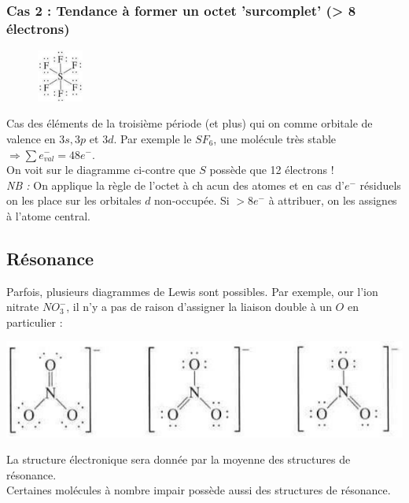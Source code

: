 \documentclass[12pt, a4paper]{article}
\begin{document}
\subsubsection{Cas 2 :  Tendance à former un octet 'surcomplet' (> 8 électrons)}
\begin{figure}
\includegraphics[width=1.5cm]{image9.png}
\end{figure}
Cas des éléments de la troisième période (et plus) qui on comme orbitale de valence en $3s, 3p$ et $3d$. Par exemple le $SF_6$, une molécule très stable\\
$\Rightarrow \sum e^-_{val} = 48 e^-$.\\
On voit sur le diagramme ci-contre que $S$ possède que 12 électrons !\\

\textit{NB :} On applique la règle de l'octet à ch acun des atomes et en cas d'$e^-$ résiduels on les place sur les orbitales $d$ non-occupée. Si $> 8 e^-$ à attribuer, on les assignes à l'atome central.
\newpage
\subsection{Résonance}
Parfois, plusieurs diagrammes de Lewis sont possibles. Par exemple, our l'ion nitrate $NO_3^-$, il  n'y a pas de raison d'assigner la liaison double à un $O$ en particulier :
\begin{center}
\includegraphics[scale=0.55]{image10.png}\\
\end{center}
La structure électronique sera donnée par la moyenne des structures de résonance.\\
Certaines molécules à nombre impair possède aussi des structures de résonance.\\
\end{document}
